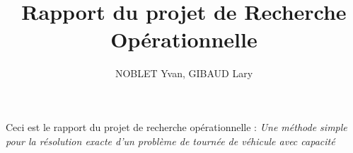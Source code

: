 \documentclass[a4paper,12pt]{report}
\title{Rapport du projet de Recherche Opérationnelle}
\author{NOBLET Yvan, GIBAUD Lary}
\begin{document}
\date{}
\maketitle
\section{}
Ceci est le rapport du projet de recherche opérationnelle : \emph{Une méthode simple pour la résolution exacte d’un problème de tournée de véhicule avec capacité}
\end{document}
